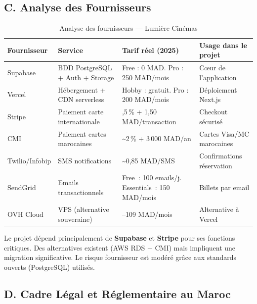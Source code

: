 \documentclass[12pt,a4paper,openany]{report}
\begin{document}
\subsection{C. Analyse des Fournisseurs}

\begin{table}[H]
\centering
\footnotesize
\setlength{\tabcolsep}{4pt}
\renewcommand{\arraystretch}{1.3}
\begin{tabularx}{\textwidth}{%
  >{\raggedright\arraybackslash}p{2.4cm}%
  >{\raggedright\arraybackslash}p{3.5cm}%
  >{\raggedright\arraybackslash}X%
  >{\raggedright\arraybackslash}p{3.3cm}}
\toprule
\textbf{Fournisseur} & \textbf{Service} & \textbf{Tarif réel (2025)} & \textbf{Usage dans le projet} \\
\midrule
Supabase      & BDD PostgreSQL + Auth + Storage  & Free : 0 MAD. Pro : 250 MAD/mois        & Cœur de l'application \\
Vercel        & Hébergement + CDN serverless     & Hobby : gratuit. Pro : 200 MAD/mois     & Déploiement Next.js \\
Stripe        & Paiement carte internationale    & 1,5\,\% + 1,50 MAD/transaction          & Checkout sécurisé \\
CMI           & Paiement cartes marocaines       & \textasciitilde{}2\,\% + 3\,000 MAD/an  & Cartes Visa/MC marocaines \\
Twilio/Infobip& SMS notifications                & \textasciitilde{}0,85 MAD/SMS           & Confirmations réservation \\
SendGrid      & Emails transactionnels           & Free~: 100 emails/j. Essentials~: 150 MAD/mois & Billets par email \\
OVH Cloud     & VPS (alternative souveraine)     & 65–109 MAD/mois                         & Alternative à Vercel \\
\bottomrule
\end{tabularx}
\caption{Analyse des fournisseurs — Lumière Cinémas}
\label{tab:fournisseurs}
\end{table}

\noindent Le projet dépend principalement de \textbf{Supabase} et \textbf{Stripe} pour ses fonctions critiques. Des alternatives existent (AWS RDS + CMI) mais impliquent une migration significative. Le risque fournisseur est modéré grâce aux standards ouverts (PostgreSQL) utilisés.

\subsection{D. Cadre Légal et Réglementaire au Maroc}
\end{document}
